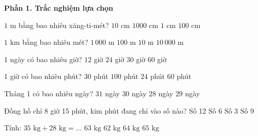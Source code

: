 \textbf{Phần 1. Trắc nghiệm lựa chọn}

\begin{ex} %
$1\text{ m}$ bằng bao nhiêu xăng-ti-mét?
\choice
{$10\text{ cm}$}
{$1000\text{ cm}$}
{$1\text{ cm}$}
{\True $100\text{ cm}$}
\end{ex}

\begin{ex} %
$1\text{ km}$ bằng bao nhiêu mét?
\choice
{\True $1\,000\text{ m}$}
{$100\text{ m}$}
{$10\text{ m}$}
{$10\,000\text{ m}$}
\end{ex}

\begin{ex} %
1 ngày có bao nhiêu giờ?
\choice
{$12$ giờ}
{\True $24$ giờ}
{$30$ giờ}
{$60$ giờ}
\end{ex}

\begin{ex} %
1 giờ có bao nhiêu phút?
\choice
{$30$ phút}
{$100$ phút}
{$24$ phút}
{\True $60$ phút}
\end{ex}

\begin{ex} %
Tháng 1 có bao nhiêu ngày?
\choice
{\True $31$ ngày}
{$30$ ngày}
{$28$ ngày}
{$29$ ngày}
\end{ex}

\begin{ex} %
Đồng hồ chỉ 8 giờ 15 phút, kim phút đang chỉ vào số nào?
\choice
{Số 12}
{Số 6}
{\True Số 3}
{Số 9}
\end{ex}

\begin{ex} %
Tính: $35\text{ kg} + 28\text{ kg} = \dots$
\choice
{\True $63\text{ kg}$}
{$62\text{ kg}$}
{$64\text{ kg}$}
{$65\text{ kg}$}
\end{ex}

